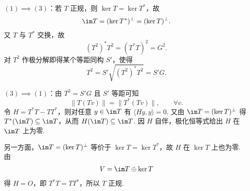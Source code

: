 \begin{enumerate}
    $(1)\implies(3)$：若 $T$ 正规，则 $\ker T=\ker T^*$，故
    \[
        \im T=(\ker T^*)^\perp=(\ker T)^\perp.
    \]
    又 $T$ 与 $T^*$ 交换，故
    \[
        (T^2)^*T^2=(T^*T)^2=G^2.
    \]
    对 $T^2$ 作极分解即得某个等距同构 $S'$，使得
    \[
        T^2=S'\sqrt{(T^2)^*T^2}=S'G.
    \]

    $(3)\implies(1)$：由 $T^2=S'G$ 且 $S'$ 等距可知
    \[
        \|T(Tv)\|=\|T^*(Tv)\|,\qquad \forall v.
    \]
    令 $H=T^*T-TT^*$，则对任意 $y\in\im T$ 有 $\langle Hy,y\rangle=0$. 又由 $\im T=(\ker T)^\perp$ 得 $T^*(\im T)\subseteq \im T$，从而 $H(\im T)\subseteq \im T$. 因 $H$ 自伴，极化恒等式给出 $H$ 在 $\im T$ 上为零.

    另一方面，$\im T=(\ker T)^\perp$ 等价于 $\ker T=\ker T^*$，故 $H$ 在 $\ker T$ 上也为零. 由
    \[
        V=\im T\oplus\ker T
    \]
    得 $H=O$，即 $T^*T=TT^*$，所以 $T$ 正规.
\end{enumerate}

\clearpage
